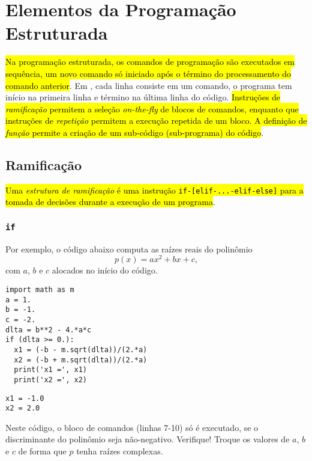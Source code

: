 

\section{Elementos da Programação Estruturada}\label{sec_progest}

\hl{Na programação estruturada, os comandos de programação são executados em sequência, um novo comando só iniciado após o término do processamento do comando anterior}. Em {\python}, cada linha consiste em um comando, o programa tem início na primeira linha e término na última linha do código. \hl{Instruções de \emph{ramificação} permitem a seleção \textit{on-the-fly} de blocos de comandos, enquanto que instruções de \emph{repetição} permitem a execução repetida de um bloco. A definição de \emph{função} permite a criação de um sub-código (sub-programa) do código}.

\subsection{Ramificação}

\hl{Uma \emph{estrutura de ramificação} é uma instrução \texttt{if-[elif-...-elif-else]} para a tomada de decisões durante a execução de um programa}.

\subsubsection{\texttt{if}}

Por exemplo, o código abaixo computa as raízes reais do polinômio
\begin{equation}
  p(x) = ax^2 + bx + c,
\end{equation}  
com $a$, $b$ e $c$ alocados no início do código.

\begin{lstlisting}
import math as m
a = 1.
b = -1.
c = -2.
dlta = b**2 - 4.*a*c
if (dlta >= 0.):
  x1 = (-b - m.sqrt(dlta))/(2.*a)
  x2 = (-b + m.sqrt(dlta))/(2.*a)
  print('x1 =', x1)
  print('x2 =', x2)
\end{lstlisting}

\begin{verbatim}
x1 = -1.0
x2 = 2.0
\end{verbatim}

Neste código, o bloco de comandos (linhas 7-10) só é executado, se o discriminante do polinômio seja não-negativo. Verifique! Troque os valores de $a$, $b$ e $c$ de forma que $p$ tenha raízes complexas.

